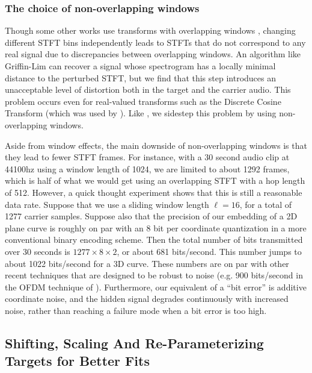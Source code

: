 \documentclass[runningheads]{llncs}
\begin{document}
\subsubsection{The choice of non-overlapping windows}
Though some other works use transforms with overlapping windows \cite{hwan_sik_yun_acoustic_2010,geleta_pixinwav_2021}, changing different STFT bins independently leads to STFTs that do not correspond to any real signal due to discrepancies between overlapping windows.  An algorithm like Griffin-Lim \cite{griffin1984signal} can recover a signal whose spectrogram has a locally minimal distance to the perturbed STFT, but we find that this step introduces an unacceptable level of distortion both in the target and the carrier audio.  This problem occurs even for real-valued transforms such as the Discrete Cosine Transform (which was used by \cite{geleta_pixinwav_2021}).  Like \cite{xiaoxiao_dong_data_2004}, we sidestep this problem by using non-overlapping windows.  

Aside from window effects, the main downside of non-overlapping windows is that they lead to fewer STFT frames.  For instance, with a 30 second audio clip at 44100hz using a window length of 1024, we are limited to about 1292 frames, which is half of what we would get using an overlapping STFT with a hop length of 512.  However, a quick thought experiment shows that this is still a reasonable data rate.  Suppose that we use a sliding window length $\ell=16$, for a total of 1277 carrier samples.  Suppose also that the precision of our embedding of a 2D plane curve is roughly on par with an 8 bit per coordinate quantization in a more conventional binary encoding scheme.  Then the total number of bits transmitted over 30 seconds is $1277 \times 8 \times 2$, or about 681 bits/second.  This number jumps to about 1022 bits/second for a 3D curve.  These numbers are on par with other recent techniques that are designed to be robust to noise (e.g. 900 bits/second in the OFDM technique of \cite{eichelberger_receiving_2019}).  Furthermore, our equivalent of a ``bit error'' is additive coordinate noise, and the hidden signal degrades continuously with increased noise, rather than reaching a failure mode when a bit error is too high.




\subsection{Shifting, Scaling And Re-Parameterizing Targets for Better Fits}
\label{sec:reparam}
\end{document}
